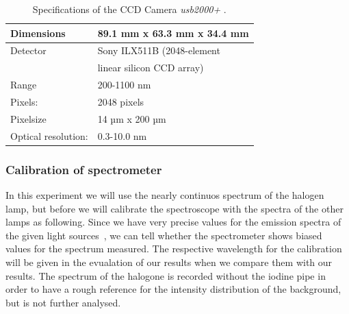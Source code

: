 \begin{table}[h]
\centering
\begin{tabular}{| l | l |}
    \hline
    Dimensions & 89.1 mm x 63.3 mm x 34.4 mm \\ 
    \hline
    Detector & Sony ILX511B (2048-element \\
             & linear silicon CCD array) \\  
    \hline
    Range & 200-1100 nm \\ 
    \hline
    Pixels: & 2048 pixels \\ 
    \hline
    Pixelsize & 14 µm x 200 µm \\ 
    \hline
    Optical resolution: & 0.3-10.0 nm \\ 
    \hline
\end{tabular}
    \caption{Specifications of the  CCD Camera \textit{usb2000+}
        \cite{usb2000_site}.}
\label{tab:ccd}
\end{table}

\subsubsection{Calibration of spectrometer}
In this experiment we will use the nearly continuos spectrum of
the halogen lamp, but before we will calibrate the spectroscope
with the spectra of the other lamps as following.
Since we have very precise values for the emission spectra of 
the given light sources~\cite{nist}, we can tell whether the 
spectrometer shows biased values for the spectrum measured. 
The respective wavelength for the calibration will be given
in the evualation of our results when we compare them with our
results. 
The spectrum of the halogone is recorded without the iodine pipe 
in order to have a rough reference for the intensity distribution 
of the background, but is not further analysed. 


